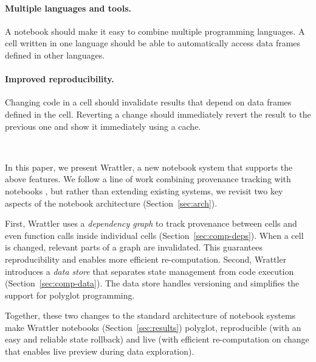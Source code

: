\documentclass[sigplan]{acmart}\settopmatter{printfolios=true,printccs=false,printacmref=false}
\begin{document}
\paragraph{Multiple languages and tools.} 
A notebook should make it easy to combine multiple programming languages. A cell written in one
language should be able to automatically access data frames defined in other languages.

\paragraph{Improved reproducibility.} 
Changing code in a cell should invalidate results that depend on data frames defined in 
the cell. Reverting a change should immediately revert the result to the previous one
and show it immediately using a cache.

\newpage
~

\noindent
In this paper, we present Wrattler, a new notebook system that supports
the above features. We follow a line of work combining provenance tracking with notebooks 
\cite{noworkflow,dataflow}, but rather than extending existing systems, we revisit
two key aspects of the notebook architecture (Section~\ref{sec:arch}). 

First, Wrattler uses a \emph{dependency graph} to track provenance between cells and even function calls 
inside individual cells (Section~\ref{sec:comp-deps}). When a cell is changed, relevant parts of a graph
are invalidated. This guarantees reproducibility and enables more efficient re-computation.
Second, Wrattler introduces a \emph{data store} that separates state management from code execution 
(Section~\ref{sec:comp-data}). The data store handles versioning and simplifies the support for polyglot programming.

Together, these two changes to the standard architecture of notebook systems make Wrattler notebooks
(Section~\ref{sec:results}) polyglot, reproducible (with an easy and reliable state rollback) and live 
(with efficient re-computation on change that enables live preview during data exploration).
\end{document}
